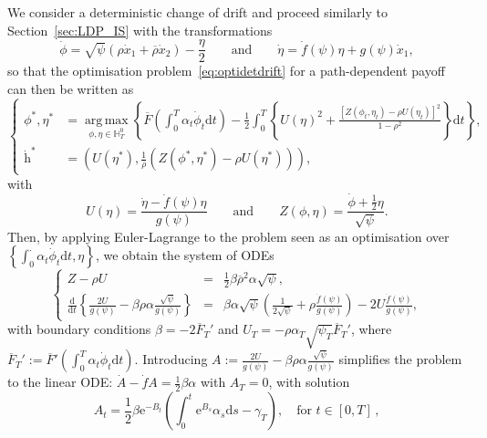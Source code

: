\documentclass{amsart}[11pt]
\numberwithin{equation}{section}
\numberwithin{theorem}{subsection}
\numberwithin{proposition}{subsection}
\numberwithin{definition}{subsection}
\numberwithin{lemma}{subsection}
\numberwithin{assumption}{subsection}
\newcommand{\HH}{\mathbb{H}}
\newcommand{\brho}{\overline{\rho}}
\newcommand{\D}{\mathrm{d}}
\newcommand{\E}{\mathrm{e}}
\newcommand{\hh}{\boldsymbol{\mathrm{h}}}
\newcommand{\half}{\frac{1}{2}}
\DeclareMathOperator*{\argmax}{arg\,max}
\begin{document}
We consider a deterministic change of drift and proceed similarly to Section~\ref{sec:LDP_IS} 
with the transformations
$$
\dot{\phi} = \sqrt{\psi}\left( \rho\dot{x}_1 + \brho\dot{x}_2 \right) - \frac{\eta}{2} \qquad \text{and} \qquad \dot{\eta} = \dot{f}(\psi)\eta + g(\psi)\dot{x}_1,
$$
so that the optimisation problem~\eqref{eq:optidetdrift} for a path-dependent payoff can then be written as
\begin{equation}\label{eq:optidetdriftapplication}
\left\{
\begin{array}{rl}
\phi^{*}, \eta^{*} & = \displaystyle  \argmax\limits_{\phi,\eta \in \HH_T^0} \left\{ \overline{F}\left(\int_0^T \alpha_t \dot{\phi}_t \D t \right) 
- \half\int_0^T \left\{U(\eta)^2 + \frac{[Z(\phi_t,\eta_t) - \rho U(\eta_t)]^2}{1-\rho^2}\right \}\D t \right\},\\
\dot{\hh}^{*}  & = \displaystyle 
\left(U(\eta^{*}),  \frac{1}{\brho}\left(Z(\phi^{*}, \eta^{*}) - \rho U(\eta^{*})\right)\right),
\end{array}
\right.
\end{equation}
with
$$
U(\eta) = \frac{\dot{\eta} - \dot{f}(\psi)\eta}{g(\psi)}
\qquad\text{and}\qquad
Z(\phi, \eta) = \frac{\dot{\phi} + \frac{1}{2}\eta}{\sqrt{\psi}}. 
$$
Then, by applying Euler-Lagrange to the problem seen as an optimisation over $\left \{\int_{0}^{\cdot} \alpha_t\dot{\phi}_t\D t,\eta\right \}$, we obtain the system of ODEs
\begin{equation*}
\left\{
\begin{array}{rcl}
Z - \rho U &=& \displaystyle \frac{1}{2}\beta\brho^2\alpha \sqrt{\psi},\\
\displaystyle \frac{\D}{\D t}\left\{\frac{2U}{g(\psi)} - \beta \rho \alpha \frac{\sqrt{\psi}}{g(\psi)}\right\} &=& \displaystyle \beta \alpha \sqrt{\psi} \left(\frac{1}{2\sqrt{\psi}} + \rho \frac{\dot{f}(\psi)}{g(\psi)} \right) -2U\frac{\dot{f}(\psi)}{g(\psi)},
\end{array}
\right.
\end{equation*}
with boundary conditions $\beta = - 2\overline{F}_T'$ and $U_T = -\rho\alpha_T\sqrt{\psi_T}\overline{F}_T'$, where $\overline{F}_T':= \overline{F}'(\int_0^T\alpha_t\dot{\phi}_t\D t)$. 
Introducing
$A := \frac{2U}{g(\psi)} - \beta \rho \alpha \frac{\sqrt{\psi}}{g(\psi)}$
simplifies the problem to the linear ODE:
$\dot{A}- \dot{f}A = \frac{1}{2}\beta\alpha$ with $A_T = 0$,
with solution
\[
A_t = \frac{1}{2}\beta \E^{-B_t}\left( \int_0^t \E^{B_s} \alpha_s \D s - \gamma_T \right),
\quad \text{for } t\in[0,T]\,,
\]
\end{document}
